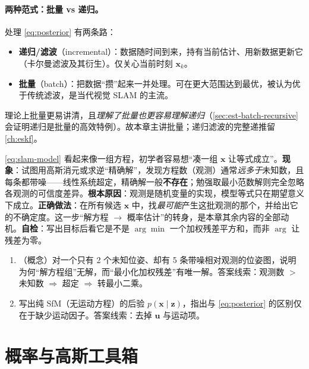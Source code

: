 \paragraph{两种范式：批量 vs 递归。}
处理 \cref{eq:posterior} 有两条路\cite{gaoxiang2019slam14}：
\begin{itemize}
  \item \textbf{递归/滤波}（incremental）：数据随时间到来，持有当前估计、用新数据更新它（卡尔曼滤波及其衍生）。仅关心当前时刻 $\mathbf{x}_k$。
  \item \textbf{批量}（batch）：把数据“攒”起来一并处理。可在更大范围达到最优，被认为优于传统滤波\cite{dellaert2017factor}，是当代视觉 SLAM 的主流。
\end{itemize}
理论上批量更易讲清，且\emph{理解了批量也更容易理解递归}（\cref{sec:est-batch-recursive} 会证明递归是批量的高效特例）。故本章主讲批量；递归滤波的完整递推留 \cref{ch:eskf}。

\begin{pitfall}
\cref{eq:slam-model} 看起来像一组方程，初学者容易想“凑一组 $\mathbf{x}$ 让等式成立”。\textbf{现象}：试图用高斯消元或求逆“精确解”，发现方程数（观测）通常\emph{远多于}未知数，且每条都带噪——线性系统超定，精确解一般\textbf{不存在}；勉强取最小范数解则完全忽略各观测的可信度差异。\textbf{根本原因}：观测是随机变量的实现，模型等式只在期望意义下成立。\textbf{正确做法}：在所有候选 $\mathbf{x}$ 中，找\emph{最可能}产生这批观测的那个，并给出它的不确定度。这一步“解方程 $\to$ 概率估计”的转身，是本章其余内容的全部动机。\textbf{自检}：写出目标后看它是不是 $\arg\min$ 一个加权残差平方和，而非 $\arg$ 让残差为零。
\end{pitfall}

\begin{practice}
\begin{enumerate}
  \item （概念）对一个只有 2 个未知位姿、却有 5 条带噪相对观测的位姿图，说明为何“解方程组”无解，而“最小化加权残差”有唯一解。答案线索：观测数 $>$ 未知数 $\Rightarrow$ 超定 $\Rightarrow$ 转最小二乘。
  \item 写出纯 SfM（无运动方程）的后验 $p(\mathbf{x}\mid\mathbf{z})$，指出与 \cref{eq:posterior} 的区别仅在于缺少运动因子。答案线索：去掉 $\mathbf{u}$ 与运动项。
\end{enumerate}
\end{practice}

\section{概率与高斯工具箱}
\label{sec:est-gauss}

